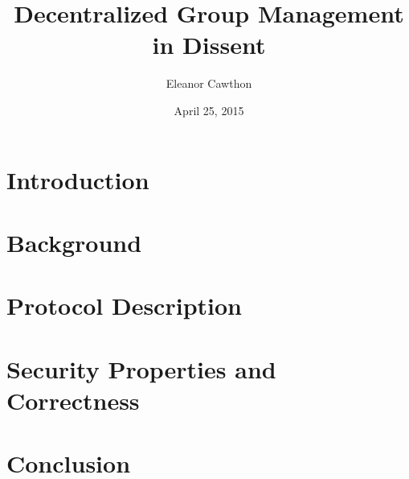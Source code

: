 \documentclass[finalcopy,nolof,nolot]{srpaper}
\title{Decentralized Group Management in Dissent}
\author{Eleanor Cawthon}
\date{April 25, 2015}
\begin{document}
\frontmatter

\chapter{Introduction}\label{Chapter:Intro}


\chapter{Background}\label{Chapter:Background}


% 
%
% 
%
\chapter{Protocol Description}\label{Chapter:Protocol}


\chapter{Security Properties and Correctness}\label{Chapter:Proofs}


\chapter{Conclusion}\label{Chapter:Conclusion}
\listoftodos


% 
%
\end{document}
